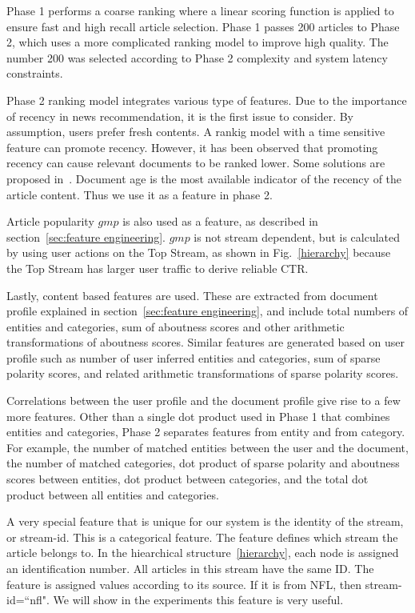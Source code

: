 


Phase 1 performs a coarse ranking where a linear scoring function is applied 
to ensure fast and high recall article selection. Phase 1 passes 200 articles 
to Phase 2, which uses a more complicated ranking model to improve high 
quality. The number 200 was selected according to Phase 2 complexity and 
system latency constraints. 

Phase 2 ranking model integrates various type of features.  Due to the 
importance of recency in news recommendation, it is the first issue to 
consider. By assumption, users prefer fresh contents. A rankig model with a 
time sensitive feature can promote recency. However, it has been observed that 
promoting recency can cause relevant documents to be ranked lower. Some 
solutions are proposed in~\cite{Dong:2010:TRR:1718487.1718490}. Document age 
is the most available indicator of the recency of the article content. Thus we 
use it as a feature in phase 2.


Article popularity $gmp$ is also used as a feature, as described in 
section~\ref{sec:feature engineering}. $gmp$ is not stream dependent, but is 
calculated by using user actions on the Top Stream, as shown in 
Fig.~\ref{hierarchy} because the Top Stream has larger user traffic to derive 
reliable CTR.

Lastly, content based features are used. These are extracted from document 
profile explained in section~\ref{sec:feature engineering}, and include total 
numbers of entities and categories, sum of aboutness scores and other 
arithmetic transformations of aboutness scores. Similar features are generated 
based on user profile such as number of user inferred entities and categories, 
sum of sparse polarity scores, and related arithmetic transformations of 
sparse polarity scores.

Correlations between the user profile and the document profile give rise to a 
few more features. Other than a single dot product used in Phase 1 that 
combines entities and categories, Phase 2 separates features from entity and 
from category. For example, the number of matched entities between the user 
and the document, the number of matched categories, dot product of sparse 
polarity and aboutness scores between entities, dot product between 
categories, and the total dot product between all entities and categories.

A very special feature that is unique for our system is the identity of the 
stream, or stream-id.  This is a categorical feature. The feature defines 
which stream the article belongs to. In the hiearchical 
structure~\ref{hierarchy}, each node is assigned an identification number. All 
articles in this stream have the same ID. The feature is assigned values 
according to its source. If it is from NFL, then stream-id=``nfl". We will 
show in the experiments this feature is very useful.  



